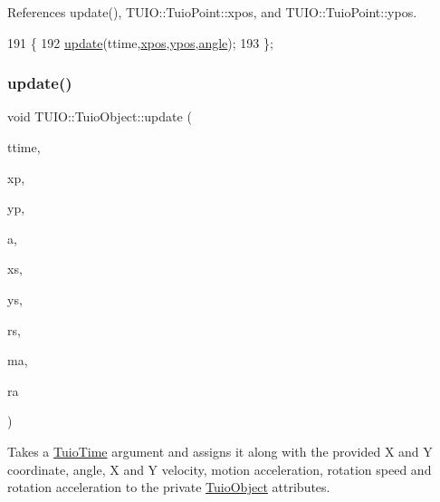 References update(), T\+U\+I\+O\+::\+Tuio\+Point\+::xpos, and T\+U\+I\+O\+::\+Tuio\+Point\+::ypos.


\begin{DoxyCode}
191                                    \{
192             \hyperlink{class_t_u_i_o_1_1_tuio_object_a8aff2aa3004d1558f0db6e95889df6e8}{update}(ttime,\hyperlink{class_t_u_i_o_1_1_tuio_point_a0021f8dfddd05f2a17e713a94f5457e6}{xpos},\hyperlink{class_t_u_i_o_1_1_tuio_point_a89a038775a681166168735dbc95c7779}{ypos},\hyperlink{class_t_u_i_o_1_1_tuio_object_a1c5652a3ee1175156f13777f0d8068ee}{angle});
193         \};
\end{DoxyCode}
\mbox{\label{class_t_u_i_o_1_1_tuio_object_a8aff2aa3004d1558f0db6e95889df6e8}} 
\subsubsection{\texorpdfstring{update()}{update()}\hspace{0.1cm}{\footnotesize\ttfamily [1/4]}}
{\footnotesize\ttfamily void T\+U\+I\+O\+::\+Tuio\+Object\+::update (\begin{DoxyParamCaption}\item[{\hyperlink{class_t_u_i_o_1_1_tuio_time}{Tuio\+Time}}]{ttime,  }\item[{float}]{xp,  }\item[{float}]{yp,  }\item[{float}]{a,  }\item[{float}]{xs,  }\item[{float}]{ys,  }\item[{float}]{rs,  }\item[{float}]{ma,  }\item[{float}]{ra }\end{DoxyParamCaption})\hspace{0.3cm}{\ttfamily [inline]}}

Takes a \hyperlink{class_t_u_i_o_1_1_tuio_time}{Tuio\+Time} argument and assigns it along with the provided X and Y coordinate, angle, X and Y velocity, motion acceleration, rotation speed and rotation acceleration to the private \hyperlink{class_t_u_i_o_1_1_tuio_object}{Tuio\+Object} attributes.


